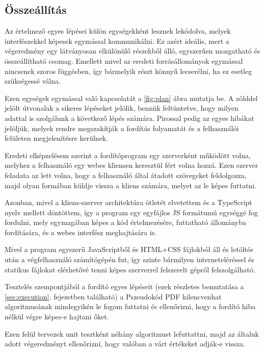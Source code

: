 \subsection{Összeállítás}


Az értelmező egyes lépései külön egységekként lesznek lekódolva, melyek interfészekkel képesek egymással kommunikálni. Ez azért ideális, mert a végeredmény egy látványosan elkülönülő részekből álló, egyszerűen mozgatható és összeállítható csomag. Emellett mivel az eredeti forrásállományok egymással nincsenek szoros függésben, így  bármelyik részt könnyű lecserélni, ha ez esetleg szükségessé válna.

Ezen egységek egymással való kapcsolatát a \ref{fig:plan} ábra mutatja be. A zölddel jelölt útvonalak a sikeres lépéseket jelölik, bennük feltüntetve, hogy milyen adattal is szolgálunk a következő lépés számára. Pirossal pedig az egyes hibákat jelöljük, melyek rendre megszakítják a fordítás folyamatát és a felhasználói felületen megjelenítésre kerülnek.

Eredeti elképzelésem szerint a fordítóprogram egy szerverként működött volna, melyhez a felhasználó egy webes kliensen keresztül fért volna hozzá. Ezen szerver feladata az lett volna, hogy a felhasználó által átadott szövegeket feldolgozza, majd olyan formában küldje vissza a kliens számára, melyet az le képes futtatni.

Azonban, mivel a kliens-szerver architektúra ötletét elvetettem és a TypeScript nyelv mellett döntöttem, így a program egy egyfájlos JS formátumú egységgé fog fordulni, mely egymagában képes a kód értelmezésére, futtatható állományba fordítására, és a webes interfész meghajtására is.

Mivel a program egyszerű JavaScriptből és HTML+CSS fájlokból áll és letöltés után a végfelhasználó számítógépén fut, így szinte bármilyen interneteléréssel és statikus fájlokat elérhetővé tenni képes szerverrel felszerelt gépről felszolgálható.

Tesztelés szempontjából a fordító egyes lépéseit (ezek részletes bemutatása a \ref{sec:execution}. fejezetben található) a Pszeudokód PDF kilencvenhat algoritmusának mindegyikén le fogom futtatni és ellenőrizni, hogy a fordító hiba nélkül végre képes-e hajtani őket.

Ezen felül tervezek unit tesztként néhány algoritmust lefuttattni, majd az általuk adott végeredményt ellenőrizni, hogy valóban a várt értékeket adják-e vissza.

